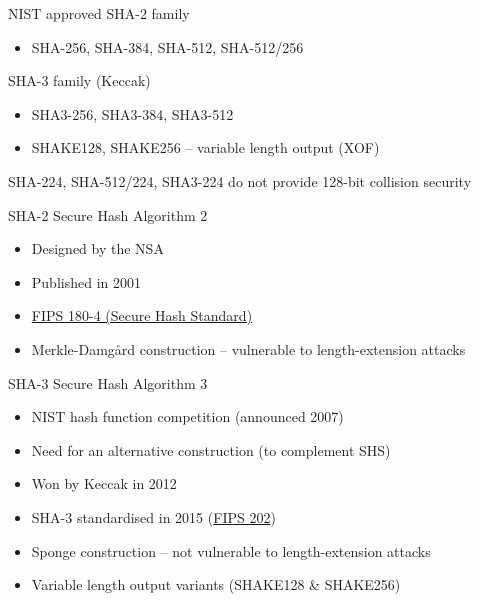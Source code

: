 \begin{frame}{NIST approved}
  SHA-2 family
    \begin{itemize}[<+(1)->]
      \item SHA-256, SHA-384, SHA-512, SHA-512/256
    \end{itemize}

  \vspace*{1em}

  \pause
  SHA-3 family (Keccak)
    \begin{itemize}[<+(1)->]
      \item SHA3-256, SHA3-384, SHA3-512
      \item SHAKE128, SHAKE256 -- variable length output (XOF)
    \end{itemize}

  \vspace*{1em}

  \pause
  SHA-224, SHA-512/224, SHA3-224 do not provide 128-bit collision security
\end{frame}

\begin{frame}{SHA-2}
  Secure Hash Algorithm 2
  \begin{itemize}
    \item Designed by the NSA
    \item Published in 2001
    \item \href{https://csrc.nist.gov/pubs/fips/180-4/upd1/final}{FIPS 180-4 (Secure Hash Standard)}
    \pause
    \item Merkle-Damgård construction -- vulnerable to length-extension attacks 
  \end{itemize}
\end{frame}

\begin{frame}{SHA-3}
  Secure Hash Algorithm 3
  \begin{itemize}[<+(1)->]
    \item NIST hash function competition (announced 2007)
    \item Need for an alternative construction (to complement SHS)
    \item Won by Keccak in 2012
    \item SHA-3 standardised in 2015 (\href{https://csrc.nist.gov/pubs/fips/202/final}{FIPS 202})
    \pause
    \item Sponge construction -- not vulnerable to length-extension attacks
    \pause
    \item Variable length output variants (SHAKE128 \& SHAKE256)
  \end{itemize}
\end{frame}

